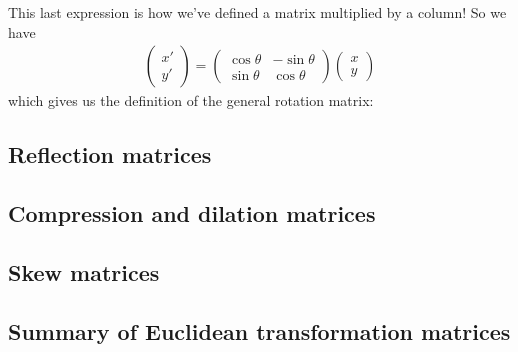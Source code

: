 This last expression is how we've defined a matrix multiplied by a column! So we have
\begin{gather*}
\begin{pmatrix} x' \\ y' \end{pmatrix}
=
\begin{pmatrix} 
\cos\theta & -\sin\theta \\ 
\sin\theta &  \cos\theta  
\end{pmatrix}
\begin{pmatrix} x \\ y \end{pmatrix}
\end{gather*}
which gives us the definition of the general rotation matrix:


\subsection*{Reflection matrices}

\subsection*{Compression and dilation matrices}

\subsection*{Skew matrices}

\subsection*{Summary of Euclidean transformation matrices}


